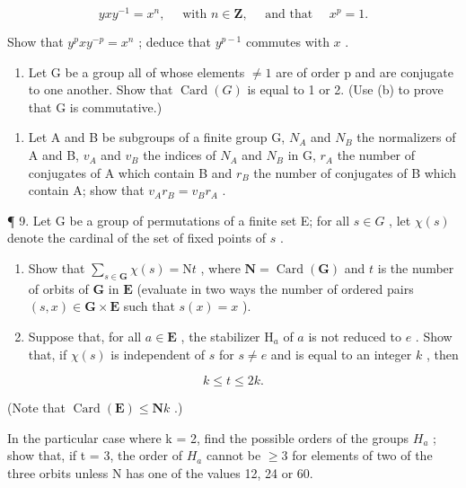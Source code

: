 \[
y x y ^ {- 1} = x ^ {n}, \quad \text { with } n \in \mathbf {Z}, \quad \text { and   that } \quad x ^ {p} = 1.
\]

Show that \(y^{p}xy^{-p} = x^{n}\) ; deduce that \(y^{p - 1}\) commutes with \(x\) .

\begin{enumerate}
\def\labelenumi{(\alph{enumi})}
\setcounter{enumi}{2}
\tightlist
\item
  Let G be a group all of whose elements \(\neq1\) are of order p and are conjugate to one another. Show that \(\operatorname{Card}(G)\) is equal to 1 or 2. (Use (b) to prove that G is commutative.)
\end{enumerate}

\begin{enumerate}
\def\labelenumi{\arabic{enumi}.}
\setcounter{enumi}{7}
\tightlist
\item
  Let A and B be subgroups of a finite group G, \(N_{A}\) and \(N_{B}\) the normalizers of A and B, \(v_{A}\) and \(v_{B}\) the indices of \(N_{A}\) and \(N_{B}\) in G, \(r_{A}\) the number of conjugates of A which contain B and \(r_{B}\) the number of conjugates of B which contain A; show that \(v_{A}r_{B} = v_{B}r_{A}\) .
\end{enumerate}

¶ 9. Let G be a group of permutations of a finite set E; for all \(s \in G\) , let \(\chi(s)\) denote the cardinal of the set of fixed points of \(s\) .

\begin{enumerate}
\def\labelenumi{(\alph{enumi})}
\item
  Show that \(\sum_{s\in \mathbf{G}}\chi (s) = \mathrm{N}t\) , where \(\mathbf{N} = \operatorname {Card}(\mathbf{G})\) and \(t\) is the number of orbits of \(\mathbf{G}\) in \(\mathbf{E}\) (evaluate in two ways the number of ordered pairs \((s,x)\in \mathbf{G}\times \mathbf{E}\) such that \(s(x) = x\) ).
\item
  Suppose that, for all \(a \in \mathbf{E}\) , the stabilizer \(\mathrm{H}_a\) of \(a\) is not reduced to \(e\) . Show that, if \(\chi(s)\) is independent of \(s\) for \(s \neq e\) and is equal to an integer \(k\) , then
\end{enumerate}

\[
k \leqslant t \leqslant 2 k.
\]

(Note that \(\operatorname{Card}(\mathbf{E}) \leqslant \mathbf{N}k\) .)

In the particular case where k = 2, find the possible orders of the groups \(H_{a}\) ; show that, if t = 3, the order of \(H_{a}\) cannot be \(\geqslant 3\) for elements of two of the three orbits unless N has one of the values 12, 24 or 60.

